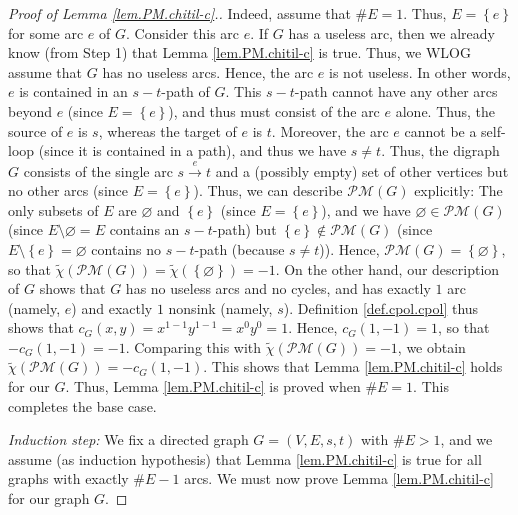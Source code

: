 \documentclass[12pt]{amsart}
\theoremstyle{definition}
\newcommand{\Pm}[1]{\mathcal{PM}\left(#1\right)}
\begin{document}
\begin{proof}[Proof of Lemma \ref{lem.PM.chitil-c}.]
Indeed, assume that $\#E=1$. Thus, $E=\left\{  e\right\}  $ for some arc $e$
of $G$. Consider this arc $e$. If $G$ has a useless arc, then we already
know (from Step 1) that Lemma \ref{lem.PM.chitil-c} is true. Thus, we WLOG
assume that $G$ has no useless arcs. Hence, the arc $e$ is not useless. In
other words, $e$ is contained in an $s-t$-path of $G$. This $s-t$-path cannot
have any other arcs beyond $e$ (since $E=\left\{  e\right\}  $), and thus
must consist of the arc $e$ alone. Thus, the source of $e$ is $s$, whereas
the target of $e$ is $t$. Moreover, the arc $e$ cannot be a self-loop (since
it is contained in a path), and thus we have $s\neq t$. Thus, the digraph $G$
consists of the single arc $s\overset{e}{\longrightarrow}t$ and a (possibly
empty) set of other vertices but no other arcs (since $E=\left\{  e\right\}
$). Thus, we can describe $\Pm{G}$ explicitly: The
only subsets of $E$ are $\varnothing$ and $\left\{  e\right\}  $ (since
$E=\left\{  e\right\}  $), and we have $\varnothing\in\Pm{G}$
(since $E\setminus\varnothing=E$ contains an $s-t$-path) but
$\left\{  e\right\}  \notin\Pm{G}$ (since
$E\setminus\left\{  e\right\}  =\varnothing$ contains no $s-t$-path (because
$s\neq t$)). Hence, $\Pm{G}=\left\{  \varnothing
\right\}  $, so that $\widetilde{\chi}\left(  \Pm{G}
\right)  =\widetilde{\chi}\left(  \left\{  \varnothing\right\}  \right)  =-1$.
On the other hand, our description of $G$ shows that $G$ has no useless arcs
and no cycles, and has exactly $1$ arc (namely, $e$) and exactly $1$ nonsink
(namely, $s$). Definition \ref{def.cpol.cpol} thus shows that $c_{G}\left(
x,y\right)  =x^{1-1}y^{1-1}=x^{0}y^{0}=1$. Hence, $c_{G}\left(  1,-1\right)
=1$, so that $-c_{G}\left(  1,-1\right)  =-1$. Comparing this with
$\widetilde{\chi}\left(  \Pm{G}\right)  =-1$, we
obtain $\widetilde{\chi}\left(  \Pm{G}\right)
=-c_{G}\left(  1,-1\right)  $. This shows that Lemma \ref{lem.PM.chitil-c}
holds for our $G$. Thus, Lemma \ref{lem.PM.chitil-c} is proved when $\#E=1$.
This completes the base case.

\textit{Induction step:} We fix a directed graph $G=\left(  V,E,s,t\right)  $
with $\#E>1$, and we assume (as induction hypothesis) that Lemma
\ref{lem.PM.chitil-c} is true for all graphs with exactly $\#E-1$ arcs.
We must now prove Lemma \ref{lem.PM.chitil-c} for our graph $G$.


\end{proof}
\end{document}
